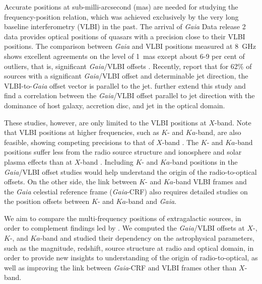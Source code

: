 \documentclass{aa-note}   %
\begin{document}
Accurate positions at sub-milli-arcsecond (mas) are needed for studying the frequency-position relation, which was achieved exclusively by the  very long baseline interferometry (VLBI) in the past.
The arrival of \textit{Gaia} Data release 2 \citep[\textit{Gaia} DR2;][]{2016A&A...595A...1G,2018A&A...616A...1G} data provides optical positions of quasars with a precision close to their VLBI positions.
The comparison between \textit{Gaia} and VLBI positions measured at 8~GHz shows excellent agreements on the level of 1~mas except about 6-9 per cent of outliers, that is, significant \textit{Gaia}/VLBI offsets \citep{2016A&A...595A...5M,2018A&A...616A..14G,2017MNRAS.471.3775P,2017MNRAS.467L..71P,2017A&A...598L...1K,2017ApJ...835L..30M,2018AJ....155..229F,2019MNRAS.482.3023P,2019ApJ...871..143P,2020MNRAS.493L..54K}.
Recently, \citet{2019MNRAS.482.3023P} report that for 62\% of sources with a significant \textit{Gaia}/VLBI offset and determinable jet direction, the VLBI-to-\textit{Gaia} offset vector is parallel to the jet.
\citet{2019ApJ...871..143P,2020MNRAS.493L..54K} further extend this study and find a correlation between the \textit{Gaia}/VLBI offset parallel to jet direction with the dominance of host galaxy, accretion disc, and jet in the optical domain.

These studies, however, are only limited to the VLBI positions at $X$-band.
Note that VLBI positions at higher frequencies, such as $K$- and $Ka$-band, are also feasible, showing competing precisions to that of $X$-band \citep[e.g.,][]{2019evga.confP.302J,2019evga.confP.306D}.
The $K$- and $Ka$-band positions suffer less from the radio source structure and ionosphere and solar plasma effects than at $X$-band \citep[e.g.,][]{2002ivsg.conf..350J}.
Including $K$- and $Ka$-band positions in the \textit{Gaia}/VLBI offset studies would help understand the origin of the radio-to-optical offsets.
On the other side, the link between $K$- and $Ka$-band VLBI frames and the \textit{Gaia} celestial reference frame (\textit{Gaia}-CRF) also requires detailed studies on the position offsets between $K$- and $Ka$-band and \textit{Gaia}.

We aim to compare the multi-frequency positions of extragalactic sources, in order to complement findings led by \citet{2019MNRAS.482.3023P}.
We computed the \textit{Gaia}/VLBI offsets at $X$-, $K$-, and $Ka$-band and studied their dependency on the astrophysical parameters, such as the magnitude, redshift, source structure at radio and optical domain, in order to provide new insights to understanding of the origin of radio-to-optical, as well as improving the link between \textit{Gaia}-CRF and VLBI frames other than $X$-band.
\end{document}
